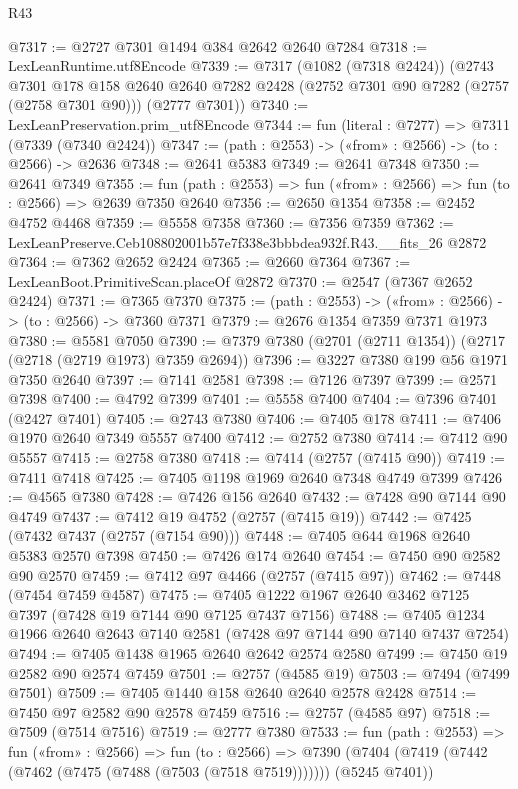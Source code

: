 \begin{lexlean}{R43}
\begin{coremodule}
@7317 := @2727 @7301 @1494 @384 @2642 @2640 @7284
@7318 := LexLeanRuntime.utf8Encode
@7339 := @7317
    (@1082 (@7318 @2424))
    (@2743
      @7301
      @178
      @158
      @2640
      @2640
      @7282
      @2428
      (@2752 @7301 @90 @7282 (@2757 (@2758 @7301 @90)))
      (@2777 @7301))
@7340 := LexLeanPreservation.prim_utf8Encode
@7344 := fun (literal : @7277) => @7311 (@7339 (@7340 @2424))
@7347 := (path : @2553) -> («from» : @2566) -> (to : @2566) -> @2636
@7348 := @2641 @5383
@7349 := @2641 @7348
@7350 := @2641 @7349
@7355 := fun (path : @2553) => fun («from» : @2566) => fun (to : @2566) => @2639 @7350 @2640
@7356 := @2650 @1354
@7358 := @2452 @4752 @4468
@7359 := @5558 @7358
@7360 := @7356 @7359
@7362 := LexLeanPreserve.Ceb108802001b57e7f338e3bbbdea932f.R43.__fits_26 @2872
@7364 := @7362 @2652 @2424
@7365 := @2660 @7364
@7367 := LexLeanBoot.PrimitiveScan.placeOf @2872
@7370 := @2547 (@7367 @2652 @2424)
@7371 := @7365 @7370
@7375 := (path : @2553) -> («from» : @2566) -> (to : @2566) -> @7360 @7371
@7379 := @2676 @1354 @7359 @7371 @1973
@7380 := @5581 @7050
@7390 := @7379 @7380 (@2701 (@2711 @1354)) (@2717 (@2718 (@2719 @1973) @7359 @2694))
@7396 := @3227 @7380 @199 @56 @1971 @7350 @2640
@7397 := @7141 @2581
@7398 := @7126 @7397
@7399 := @2571 @7398
@7400 := @4792 @7399
@7401 := @5558 @7400
@7404 := @7396 @7401 (@2427 @7401)
@7405 := @2743 @7380
@7406 := @7405 @178
@7411 := @7406 @1970 @2640 @7349 @5557 @7400
@7412 := @2752 @7380
@7414 := @7412 @90 @5557
@7415 := @2758 @7380
@7418 := @7414 (@2757 (@7415 @90))
@7419 := @7411 @7418
@7425 := @7405 @1198 @1969 @2640 @7348 @4749 @7399
@7426 := @4565 @7380
@7428 := @7426 @156 @2640
@7432 := @7428 @90 @7144 @90 @4749
@7437 := @7412 @19 @4752 (@2757 (@7415 @19))
@7442 := @7425 (@7432 @7437 (@2757 (@7154 @90)))
@7448 := @7405 @644 @1968 @2640 @5383 @2570 @7398
@7450 := @7426 @174 @2640
@7454 := @7450 @90 @2582 @90 @2570
@7459 := @7412 @97 @4466 (@2757 (@7415 @97))
@7462 := @7448 (@7454 @7459 @4587)
@7475 := @7405 @1222 @1967 @2640 @3462 @7125 @7397 (@7428 @19 @7144 @90 @7125 @7437 @7156)
@7488 := @7405 @1234 @1966 @2640 @2643 @7140 @2581 (@7428 @97 @7144 @90 @7140 @7437 @7254)
@7494 := @7405 @1438 @1965 @2640 @2642 @2574 @2580
@7499 := @7450 @19 @2582 @90 @2574 @7459
@7501 := @2757 (@4585 @19)
@7503 := @7494 (@7499 @7501)
@7509 := @7405 @1440 @158 @2640 @2640 @2578 @2428
@7514 := @7450 @97 @2582 @90 @2578 @7459
@7516 := @2757 (@4585 @97)
@7518 := @7509 (@7514 @7516)
@7519 := @2777 @7380
@7533 := fun (path : @2553) =>
  fun («from» : @2566) =>
  fun (to : @2566) =>
  @7390 (@7404 (@7419 (@7442 (@7462 (@7475 (@7488 (@7503 (@7518 @7519))))))) (@5245 @7401))

\end{coremodule}
\end{lexlean}
